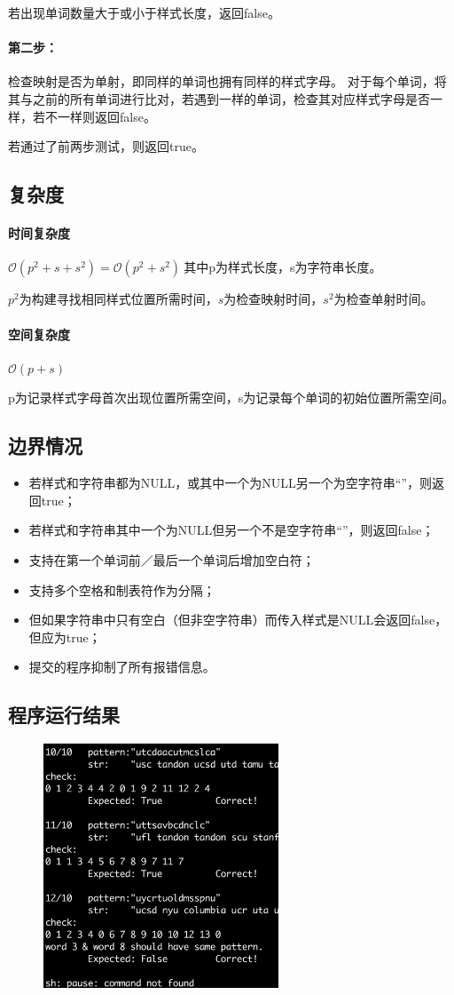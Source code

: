\documentclass{homework}
\begin{document}
若出现单词数量大于或小于样式长度，返回false。
\paragraph{第二步：}检查映射是否为单射，即同样的单词也拥有同样的样式字母。
对于每个单词，将其与之前的所有单词进行比对，若遇到一样的单词，检查其对应样式字母是否一样，若不一样则返回false。

若通过了前两步测试，则返回true。
\subsection{复杂度}
\paragraph{时间复杂度}
$\mathcal{O}(p^2+s+s^2)=\mathcal{O}(p^2+s^2) ~ $其中p为样式长度，s为字符串长度。

$p^2$为构建寻找相同样式位置所需时间，$s$为检查映射时间，$s^2$为检查单射时间。
\paragraph{空间复杂度}
$\mathcal{O}(p+s)$

p为记录样式字母首次出现位置所需空间，s为记录每个单词的初始位置所需空间。
\subsection{边界情况}
\begin{itemize}
    \item 若样式和字符串都为NULL，或其中一个为NULL另一个为空字符串“”，则返回true；
    \item 若样式和字符串其中一个为NULL但另一个不是空字符串“”，则返回false；
    \item 支持在第一个单词前／最后一个单词后增加空白符；
    \item 支持多个空格和制表符作为分隔；
    \item 但如果字符串中只有空白（但非空字符串）而传入样式是NULL会返回false，但应为true；
    \item 提交的程序抑制了所有报错信息。
\end{itemize}
\subsection{程序运行结果}
\begin{figure}[H]
    \centering
    \includegraphics[width=7cm]{wp.png}
\end{figure}
\end{document}
